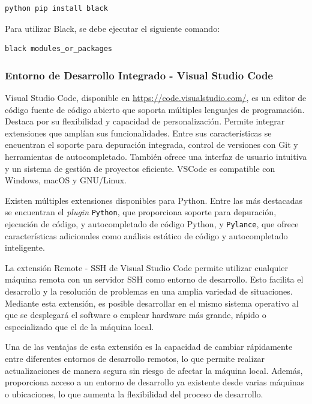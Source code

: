 \begin{lstlisting}[language=bash]
python pip install black
\end{lstlisting}

Para utilizar Black, se debe ejecutar el siguiente comando:

\begin{lstlisting}[language=bash]
black modules_or_packages
\end{lstlisting}

\subsubsection{Entorno de Desarrollo Integrado - Visual Studio Code}

Visual Studio Code, disponible en \url{https://code.visualstudio.com/}, es un editor de código fuente de código abierto que soporta múltiples lenguajes de programación. Destaca por su flexibilidad y capacidad de personalización. Permite integrar extensiones que amplían sus funcionalidades. Entre sus características se encuentran el soporte para depuración integrada, control de versiones con Git y herramientas de autocompletado. También ofrece una interfaz de usuario intuitiva y un sistema de gestión de proyectos eficiente. VSCode es compatible con Windows, macOS y GNU/Linux.

Existen múltiples extensiones disponibles para Python. Entre las más destacadas se encuentran el \textit{plugin} \texttt{Python}, que proporciona soporte para depuración, ejecución de código, y autocompletado de código Python, y \texttt{Pylance}, que ofrece características adicionales como análisis estático de código y autocompletado inteligente.

La extensión Remote - SSH de Visual Studio Code permite utilizar cualquier máquina remota con un servidor SSH como entorno de desarrollo. Esto facilita el desarrollo y la resolución de problemas en una amplia variedad de situaciones. Mediante esta extensión, es posible desarrollar en el mismo sistema operativo al que se desplegará el software o emplear hardware más grande, rápido o especializado que el de la máquina local.

Una de las ventajas de esta extensión es la capacidad de cambiar rápidamente entre diferentes entornos de desarrollo remotos, lo que permite realizar actualizaciones de manera segura sin riesgo de afectar la máquina local. Además, proporciona acceso a un entorno de desarrollo ya existente desde varias máquinas o ubicaciones, lo que aumenta la flexibilidad del proceso de desarrollo.

